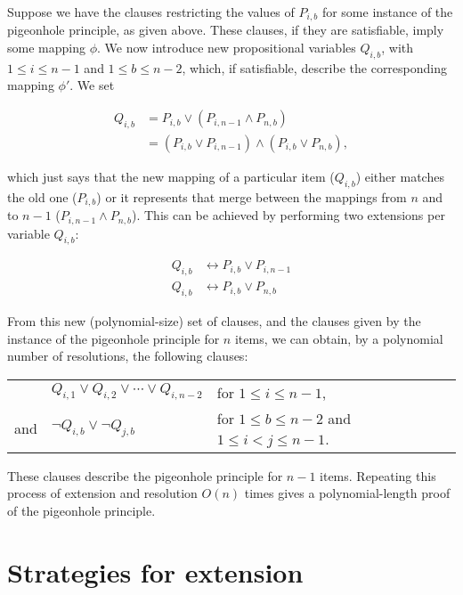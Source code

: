 \documentclass[pdftex,11pt,a4]{article}
\begin{document}
Suppose we have the clauses restricting the values of $P_{i,b}$ for some instance of the pigeonhole principle, as given above. These clauses, if they are satisfiable, imply some mapping $\phi$. We now introduce new propositional variables $Q_{i,b}$, with $1 \leq i \leq n-1$ and $1 \leq b \leq n-2$, which, if satisfiable, describe the corresponding mapping $\phi'$. We set

\begin{equation*}
  \begin{align*}
    Q_{i,b} &= P_{i,b} \vee (P_{i,n-1} \wedge P_{n,b}) \\
      &= (P_{i,b} \vee P_{i,n-1}) \wedge (P_{i,b} \vee P_{n,b}),
  \end{align*}
\end{equation*}

which just says that the new mapping of a particular item ($Q_{i,b}$) either matches the old one ($P_{i,b}$) or it represents that merge between the mappings from $n$ and to $n-1$ ($P_{i,n-1} \wedge P_{n,b}$). This can be achieved by performing two extensions per variable $Q_{i,b}$:

\begin{equation*}
  \begin{align*}
    Q_{i,b} &\leftrightarrow P_{i,b} \vee P_{i,n-1} \\
    Q_{i,b} &\leftrightarrow P_{i,b} \vee P_{n,b}
  \end{align*}
\end{equation*}

From this new (polynomial-size) set of clauses, and the clauses given by the instance of the pigeonhole principle for $n$ items, we can obtain, by a polynomial number of resolutions, the following clauses:

\begin{table}[h]
  \begin{tabular}{rll}
        & $Q_{i,1} \vee Q_{i,2} \vee \cdots \vee Q_{i,n-2}$ & for $1 \leq i \leq n-1$, \\
    and & $\neg Q_{i,b} \vee \neg Q_{j,b}$ & for $1 \leq b \leq n-2$ and $1 \leq i < j \leq n-1$.
  \end{tabular}
\end{table}
\FloatBarrier

These clauses describe the pigeonhole principle for $n-1$ items. Repeating this process of extension and resolution $O(n)$ times gives a polynomial-length proof of the pigeonhole principle.

\section{Strategies for extension}
\end{document}
